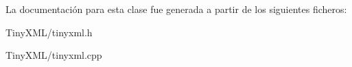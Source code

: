 La documentación para esta clase fue generada a partir de los siguientes ficheros\-:\begin{DoxyCompactItemize}
\item 
Tiny\-X\-M\-L/tinyxml.\-h\item 
Tiny\-X\-M\-L/tinyxml.\-cpp\end{DoxyCompactItemize}
